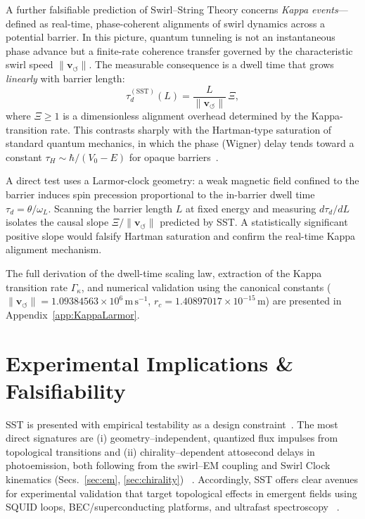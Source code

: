 \documentclass[10pt,reprint,aps,onecolumn,nofootinbib]{revtex4-2}
\begin{document}
    A further falsifiable prediction of Swirl--String Theory concerns \emph{Kappa events}---defined as real-time, phase-coherent alignments of swirl dynamics across a potential barrier. In this picture, quantum tunneling is not an instantaneous phase advance but a finite-rate coherence transfer governed by the characteristic swirl speed $\lVert\mathbf{v}_{\!\boldsymbol{\circlearrowleft}}\rVert$. The measurable consequence is a dwell time that grows \emph{linearly} with barrier length:
    \begin{equation}
        \tau^{(\mathrm{SST})}_d(L) = \frac{L}{\lVert\mathbf{v}_{\!\boldsymbol{\circlearrowleft}}\rVert}\,\Xi,
    \end{equation}
    where $\Xi \ge 1$ is a dimensionless alignment overhead determined by the Kappa-transition rate. This contrasts sharply with the Hartman-type saturation of standard quantum mechanics, in which the phase (Wigner) delay tends toward a constant $\tau_H \sim \hbar/(V_0-E)$ for opaque barriers~\cite{Buttiker1983,HaugeStovneng1989,Winful2006}.

    A direct test uses a Larmor-clock geometry: a weak magnetic field confined to the barrier induces spin precession proportional to the in-barrier dwell time $\tau_d = \theta/\omega_L$. Scanning the barrier length $L$ at fixed energy and measuring $d\tau_d/dL$ isolates the causal slope $\Xi/\lVert\mathbf{v}_{\!\boldsymbol{\circlearrowleft}}\rVert$ predicted by SST. A statistically significant positive slope would falsify Hartman saturation and confirm the real-time Kappa alignment mechanism.

    The full derivation of the dwell-time scaling law, extraction of the Kappa transition rate $\Gamma_\kappa$, and numerical validation using the canonical constants ($\lVert\mathbf{v}_{\!\boldsymbol{\circlearrowleft}}\rVert = 1.09384563\times10^{6}\,\mathrm{m\,s^{-1}}$, $r_c = 1.40897017\times10^{-15}\,\mathrm{m}$) are presented in Appendix~\ref{app:KappaLarmor}.


\section{Experimental Implications \& Falsifiability}\label{sec:falsifiability}
    SST is presented with empirical testability as a design constraint~\cite{Hossenfelder2018}. The most direct signatures are (i) geometry–independent, quantized flux impulses from topological transitions and (ii) chirality–dependent attosecond delays in photoemission, both following from the swirl–EM coupling and Swirl Clock kinematics (Secs.~\ref{sec:em}, \ref{sec:chirality})~ \cite{EM_G}. Accordingly, SST offers clear avenues for experimental validation that target topological effects in emergent fields using SQUID loops, BEC/superconducting platforms, and ultrafast spectroscopy~ \cite{EM_G}.
\end{document}
